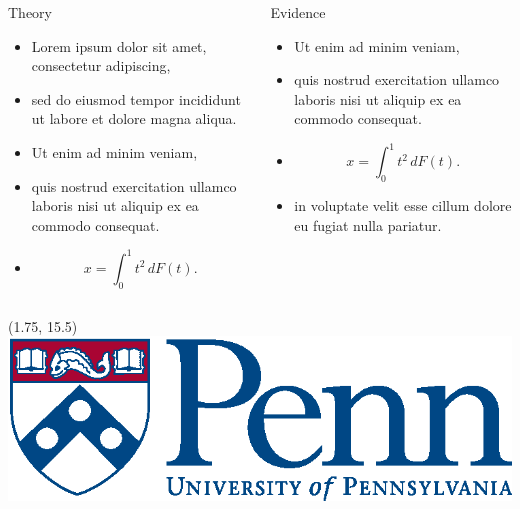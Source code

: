 \documentclass[12pt, final]{beamer}
\newlength{\onecolwid}
\newlength{\twocolwid}
\begin{document}
\begin{frame}[t]
\begin{columns}[t]
\begin{column}{\twocolwid}
      \begin{columns}[t]
        \begin{column}{\onecolwid}
          \begin{block}{Theory}
            \begin{itemize}
              \item Lorem ipsum \alert{dolor} sit amet, consectetur adipiscing,
              \item sed do eiusmod tempor incididunt ut labore et dolore magna aliqua.
              \item Ut enim ad minim veniam,
              \item quis nostrud exercitation ullamco laboris nisi ut aliquip ex ea commodo consequat.
              \item $$x = \int_0^1 t^2 \,dF(t).$$
            \end{itemize}
          \end{block}
        \end{column}
        \begin{column}{\onecolwid}
          \begin{block}{Evidence}
            \begin{itemize}
              \item Ut enim ad minim veniam,
              \item quis nostrud exercitation ullamco laboris nisi ut aliquip ex ea commodo consequat.
              \item $$x = \int_0^1 t^2 \,dF(t).$$
              \item in voluptate velit \alert{esse cillum dolore} eu fugiat nulla pariatur.
            \end{itemize}
          \end{block}
        \end{column}
      \end{columns}
    \end{column}
  \end{columns}

  \begin{textblock}{10}(1.75, 15.5)
   \includegraphics[scale=2]{penn}
  \end{textblock}

\end{frame}
\end{document}

